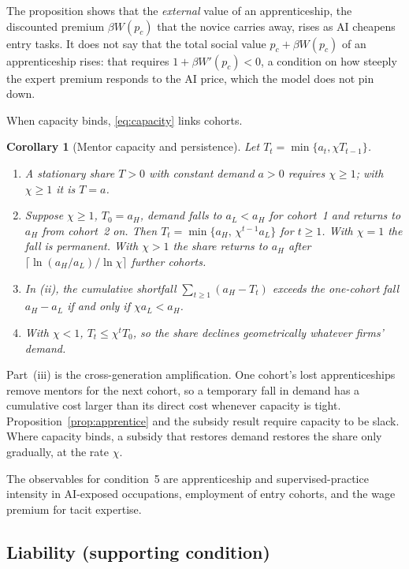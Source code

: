 \documentclass[12pt]{article}
\newtheorem{corollary}{Corollary}
\theoremstyle{remark}
\begin{document}
The proposition shows that the \emph{external} value of an apprenticeship, the discounted premium $\beta W(p_c)$ that the novice carries away, rises as AI cheapens entry tasks. It does not say that the total social value $p_c+\beta W(p_c)$ of an apprenticeship rises: that requires $1+\beta W'(p_c)<0$, a condition on how steeply the expert premium responds to the AI price, which the model does not pin down.

When capacity binds, \eqref{eq:capacity} links cohorts.

\begin{corollary}[Mentor capacity and persistence]\label{cor:capacity}
Let $T_t=\min\{a_t,\chi T_{t-1}\}$.
\begin{enumerate}[label=(\roman*),itemsep=0pt]
\item A stationary share $T>0$ with constant demand $a>0$ requires $\chi\ge1$; with $\chi\ge1$ it is $T=a$.
\item Suppose $\chi\ge1$, $T_0=a_H$, demand falls to $a_L<a_H$ for cohort~1 and returns to $a_H$ from cohort~2 on. Then $T_t=\min\{a_H,\,\chi^{t-1}a_L\}$ for $t\ge1$. With $\chi=1$ the fall is permanent. With $\chi>1$ the share returns to $a_H$ after $\lceil\ln(a_H/a_L)/\ln\chi\rceil$ further cohorts.
\item In (ii), the cumulative shortfall $\sum_{t\ge1}(a_H-T_t)$ exceeds the one-cohort fall $a_H-a_L$ if and only if $\chi a_L<a_H$.
\item With $\chi<1$, $T_t\le\chi^tT_0$, so the share declines geometrically whatever firms' demand.
\end{enumerate}
\end{corollary}

Part~(iii) is the cross-generation amplification. One cohort's lost apprenticeships remove mentors for the next cohort, so a temporary fall in demand has a cumulative cost larger than its direct cost whenever capacity is tight. Proposition~\ref{prop:apprentice} and the subsidy result require capacity to be slack. Where capacity binds, a subsidy that restores demand restores the share only gradually, at the rate $\chi$.

The observables for condition~5 are apprenticeship and supervised-practice intensity in AI-exposed occupations, employment of entry cohorts, and the wage premium for tacit expertise.

\subsection{Liability (supporting condition)}\label{sec:liability}
\end{document}
